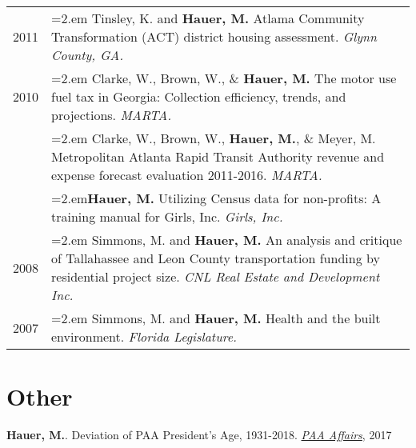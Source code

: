 \begin{tabularx}{\linewidth}{lX}
2011   & \hangindent=2.em Tinsley, K. and \textbf{Hauer, M.} Atlama Community Transformation (ACT) district housing assessment. \textit{Glynn County,               GA.}\\
2010    & \hangindent=2.em Clarke, W., Brown, W., \& \textbf{Hauer, M.} The motor use fuel tax in Georgia: Collection efficiency, trends, and                        projections. \textit{MARTA.}\\
       & \hangindent=2.em Clarke, W., Brown, W., \textbf{Hauer, M.}, \& Meyer, M. Metropolitan Atlanta Rapid Transit Authority revenue and expense         forecast evaluation 2011-2016. \textit{MARTA.}\\
      & \hangindent=2.em\textbf{Hauer, M.} Utilizing Census data for non-profits: A training manual for Girls, Inc. \textit{Girls, Inc.}\\
2008    & \hangindent=2.em Simmons, M. and \textbf{Hauer, M.} An analysis and critique of Tallahassee and Leon County transportation funding by                      residential project size. \textit{CNL Real Estate and Development Inc.}\\
2007    & \hangindent=2.em Simmons, M. and \textbf{Hauer, M.} Health and the built environment. \textit{Florida Legislature.}\\
\end{tabularx}

\section{Other}

\textbf{Hauer, M.}. Deviation of PAA President's Age, 1931-2018. \href{http://www.populationassociation.org/wp-content/uploads/PAA-Fall-2017.pdf}{\textit{PAA Affairs}}, 2017
